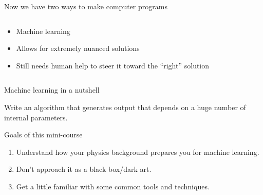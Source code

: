 \documentclass[aspectratio=169]{beamer}
\begin{document}
\begin{frame}{Now we have two ways to make computer programs}
\begin{columns}[t]
\begin{center}
\normalsize
\vspace{0.25 cm}
\begin{itemize}
\item Machine learning
\item Allows for extremely nuanced solutions
\item Still needs human help to steer it toward the ``right'' solution
\end{itemize}
\end{center}

\end{columns}
\end{frame}

\begin{frame}{Machine learning in a nutshell}
\vspace{0.4 cm}
\Large

Write an algorithm that generates output that depends on a huge number of internal parameters.

\vspace{0.5 cm}

\vspace{0.5 cm}

\vspace{0.5 cm}
\end{frame}

\begin{frame}{Goals of this mini-course}
\vspace{0.4 cm}
\Large

\begin{enumerate}\setlength{\itemsep}{0.5 cm}
\item Understand how your physics background prepares you for machine learning.
\item Don't approach it as a black box/dark art.
\item Get a little familiar with some common tools and techniques.
\end{enumerate}
\end{frame}
\end{document}
